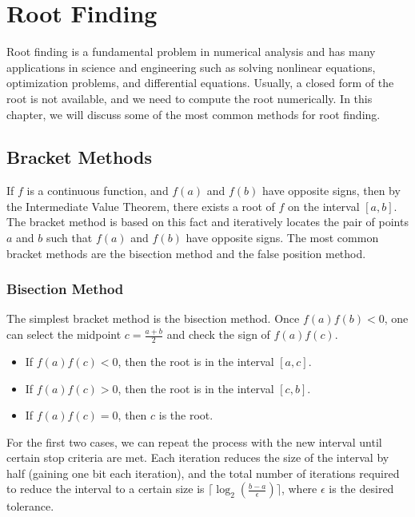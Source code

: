 \chapter{Root Finding}
\label{Ch: 0-Ro-Fi}

Root finding is a fundamental problem in numerical analysis and has many applications in science and engineering such as solving nonlinear equations, optimization problems, and differential equations. Usually, a closed form of the root is not available, and we need to compute the root numerically. In this chapter, we will discuss some of the most common methods for root finding.

\section{Bracket Methods}
\label{Sec: 0-Br-Me}

If $f$ is a continuous function, and $f(a)$ and $f(b)$ have opposite signs, then by the Intermediate Value Theorem, there exists a root of $f$ on the interval $[a, b]$. The bracket method is based on this fact and iteratively locates the pair of points $a$ and $b$ such that $f(a)$ and $f(b)$ have opposite signs. The most common bracket methods are the bisection method and the false position method.

\subsection{Bisection Method}
\label{SSec: 0-Bi-Me}

The simplest bracket method is the bisection method. Once $f(a)f(b) < 0$, one can select the midpoint $c = \frac{a + b}{2}$ and check the sign of $f(a) f(c)$.

\begin{itemize}
    \item If $f(a)f(c) < 0$, then the root is in the interval $[a, c]$.
    \item If $f(a)f(c) > 0$, then the root is in the interval $[c, b]$.
    \item If $f(a)f(c) = 0$, then $c$ is the root.
\end{itemize}

For the first two cases, we can repeat the process with the new interval until certain stop criteria are met. Each iteration reduces the size of the interval by half (gaining one bit each iteration), and the total number of iterations required to reduce the interval to a certain size is $\lceil\log_2\left(\frac{b - a}{\epsilon}\right)\rceil$, where $\epsilon$ is the desired tolerance.

